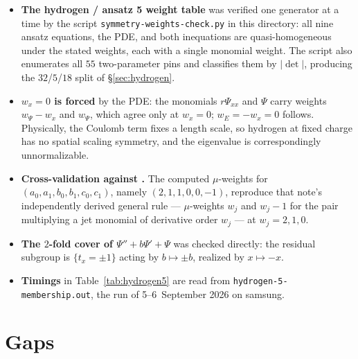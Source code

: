 \documentclass[11pt]{article}
\newcommand{\code}[1]{\texttt{#1}}
\theoremstyle{plain}
\theoremstyle{definition}
\theoremstyle{remark}
\begin{document}
\begin{itemize}
\item \textbf{The hydrogen / ansatz 5 weight table} was verified one
      generator at a time by the script
      \code{symmetry-weights-check.py} in this
      directory: all nine ansatz equations, the PDE, and both inequations are
      quasi-homogeneous under the stated weights, each with a single monomial
      weight. The script also enumerates all $55$ two-parameter pins and
      classifies them by $|\det|$, producing the $32$/$5$/$18$ split of
      \S\ref{sec:hydrogen}.
\item \textbf{$w_x = 0$ is forced} by the PDE: the monomials $r\Psi_{xx}$ and
      $\Psi$ carry weights $w_\Psi - w_x$ and $w_\Psi$, which agree only at
      $w_x = 0$; $w_E = -w_x = 0$ follows. Physically, the Coulomb term fixes a
      length scale, so hydrogen at fixed charge has no spatial scaling
      symmetry, and the eigenvalue is correspondingly unnormalizable.
\item \textbf{Cross-validation against \cite{ansatz25}.} The computed
      $\mu$-weights for $(a_0,a_1,b_0,b_1,c_0,c_1)$, namely
      $(2,1,1,0,0,-1)$, reproduce that note's independently derived
      general rule --- $\mu$-weights $w_j$ and $w_j - 1$ for the pair
      multiplying a jet monomial of derivative order $w_j$ --- at
      $w_j = 2, 1, 0$.
\item \textbf{The $2$-fold cover of $\Psi'' + b\Psi' + \Psi$} was checked
      directly: the residual subgroup is $\{t_x = \pm 1\}$ acting by
      $b \mapsto \pm b$, realized by $x \mapsto -x$.
\item \textbf{Timings} in Table~\ref{tab:hydrogen5} are read from
      \code{hydrogen-5-membership.out}, the run of 5--6~September 2026 on
      samsung.
\end{itemize}

\section{Gaps}
\label{sec:gaps}
\end{document}
